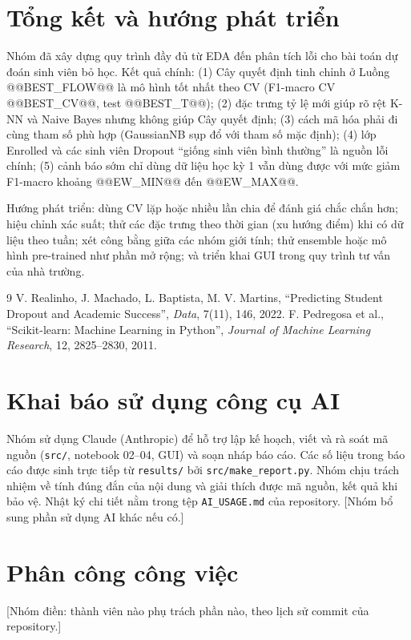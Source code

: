 \documentclass[12pt,a4paper]{article}
\begin{document}
\section{Tổng kết và hướng phát triển}
Nhóm đã xây dựng quy trình đầy đủ từ EDA đến phân tích lỗi cho bài toán dự đoán sinh viên bỏ học. Kết quả chính: (1) Cây quyết định tinh chỉnh ở
Luồng @@BEST_FLOW@@ là mô hình tốt nhất theo CV (F1-macro CV @@BEST_CV@@, test @@BEST_T@@); (2) đặc trưng tỷ lệ mới giúp rõ rệt K-NN và Naive Bayes nhưng không giúp
Cây quyết định; (3) cách mã hóa phải đi cùng tham số phù hợp (GaussianNB sụp đổ với tham số mặc định); (4) lớp Enrolled và các sinh viên Dropout ``giống sinh viên bình thường'' là
nguồn lỗi chính; (5) cảnh báo sớm chỉ dùng dữ liệu học kỳ 1 vẫn dùng được với mức giảm F1-macro khoảng @@EW_MIN@@ đến @@EW_MAX@@.

Hướng phát triển: dùng CV lặp hoặc nhiều lần chia để đánh giá chắc chắn hơn; hiệu chỉnh xác suất; thử các đặc trưng theo thời gian (xu hướng điểm) khi có dữ liệu theo tuần;
xét công bằng giữa các nhóm giới tính; thử ensemble hoặc mô hình pre-trained như phần mở rộng; và triển khai GUI trong quy trình tư vấn của nhà trường.

\begin{thebibliography}{9}
 V. Realinho, J. Machado, L. Baptista, M. V. Martins, ``Predicting Student Dropout and Academic Success'', \textit{Data}, 7(11), 146, 2022.
 F. Pedregosa et al., ``Scikit-learn: Machine Learning in Python'', \textit{Journal of Machine Learning Research}, 12, 2825--2830, 2011.
\end{thebibliography}

\appendix
\section{Khai báo sử dụng công cụ AI}
Nhóm sử dụng Claude (Anthropic) để hỗ trợ lập kế hoạch, viết và rà soát mã nguồn (\texttt{src/}, notebook 02--04, GUI) và soạn nháp báo cáo. Các số liệu trong báo cáo được
sinh trực tiếp từ \texttt{results/} bởi \texttt{src/make\_report.py}. Nhóm chịu trách nhiệm về tính đúng đắn của nội dung và giải thích được mã nguồn, kết quả khi bảo vệ.
Nhật ký chi tiết nằm trong tệp \texttt{AI\_USAGE.md} của repository. [Nhóm bổ sung phần sử dụng AI khác nếu có.]

\section{Phân công công việc}
[Nhóm điền: thành viên nào phụ trách phần nào, theo lịch sử commit của repository.]
\end{document}
